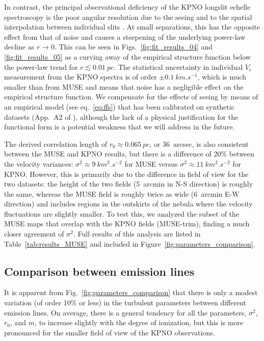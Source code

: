 \documentclass[fleqn,usenatbib, useAMS, a4paper]{mnras}
\newcommand\vcentroid{\ensuremath{V_{\text{c}}}}
\begin{document}
In contrast, the principal observational deficiency of the KPNO longslit echelle spectroscopy
is the poor angular resolution due to the seeing and to the spatial interpolation between individual slits \citep{Garcia-Diaz:2008a}.
At small separations, this has the opposite effect from that of noise
and causes a steepening of the underlying power-law decline as \(r \to 0\).
This can be seen in Figs.~\ref{fig:fit_results_04} and \ref{fig:fit_results_05}
as a curving away of the empirical structure function below the power-law trend
for \(r \lesssim \qty{0.01}{pc}\).
The statistical uncertainty in individual \(\vcentroid\) measurement from the KPNO spectra
is of order \(\pm \qty{0.1}{km.s^{-1}}\),
which is much smaller than from MUSE and means that noise has a negligible effect on the empirical structure function.
We compensate for the effects of seeing by means of an empirical model (see eq.~\eqref{eq:ffs})
that has been calibrated on synthetic datasets (App.~A2 of \citealp{garciav23}),
although the lack of a physical justification for the functional form is a potential weakness
that we will address in the future.

The derived correlation length of \(r_0 \approx \qty{0.065}{pc}\), or \qty{36}{arcsec},
is also consistent between the MUSE and KPNO results,
but there is a difference of 20\% between the velocity variances:
\(\sigma^2 \approx \qty{9}{km^2.s^{-2}}\) for MUSE versus
\(\sigma^2 \approx \qty{11}{km^2.s^{-2}}\) for KPNO.
However, this is primarily due to the difference in field of view for the two datasets:
the height of the two fields (\qty{5}{arcmin} in N-S direction) is roughly the same,
whereas the MUSE field is roughly twice as wide (\qty{6}{arcmin} E-W direction) and includes regions in the outskirts of the nebula where the velocity fluctuations are slightly smaller.
To test this, we analyzed the subset of the MUSE maps that overlap with the KPNO fields (MUSE-trim),
finding a much closer agreement of \(\sigma^2\).
Full results of this analysis are listed in Table~\ref{tab:results_MUSE} and included in Figure~\ref{fig:parameters_comparison}.

\subsection{Comparison between emission lines}
\label{sec:comp-betw-emiss}

It is apparent from Fig.~\ref{fig:parameters_comparison} that there is only a modest variation
(of order 10\% or less) in the turbulent parameters between different emission lines.
On average, there is a general tendency for all the parameters,
\(\sigma^2\), \(r_0\), and \(m\),
to increase slightly with the degree of ionization,
but this is more pronounced for the smaller field of view of the KPNO observations.
\end{document}
